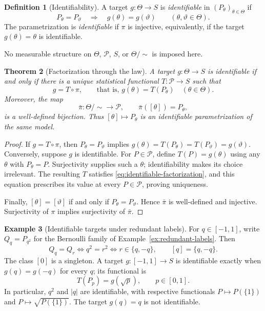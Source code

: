 \documentclass[11pt,oneside]{book}
\newtheorem{theorem}{Theorem}[chapter]
\theoremstyle{definition}
\newtheorem{definition}[theorem]{Definition}
\newtheorem{example}[theorem]{Example}
\theoremstyle{remark}
\begin{document}
\begin{definition}[Identifiability]
\label{def:identifiability}
A target $g:\Theta\to S$ is \emph{identifiable} in $(P_\theta)_{\theta\in\Theta}$
if
\[
P_\theta=P_\vartheta\quad\Longrightarrow\quad g(\theta)=g(\vartheta)
\qquad(\theta,\vartheta\in\Theta).
\]
The parametrization is \emph{identifiable} if $\pi$ is injective, equivalently,
if the target $g(\theta)=\theta$ is identifiable.
\end{definition}

No measurable structure on $\Theta$, $\mathcal P$, $S$, or $\Theta/{\sim}$
is imposed here.

\begin{theorem}[Factorization through the law]
\label{thm:identifiable-factorization}
A target $g:\Theta\to S$ is identifiable if and only if there is a unique
statistical functional $T:\mathcal P\to S$ such that
\begin{equation}
g=T\circ\pi,\qquad\text{that is, }g(\theta)=T(P_\theta)
\quad(\theta\in\Theta).
\label{eq:identifiable-factorization}
\end{equation}
Moreover, the map
\[
\bar\pi:\Theta/{\sim}\longrightarrow\mathcal P,\qquad
\bar\pi([\theta])=P_\theta,
\]
is a well-defined bijection. Thus $[\theta]\mapsto P_\theta$ is an
identifiable parametrization of the same model.
\end{theorem}
\begin{proof}
If $g=T\circ\pi$, then $P_\theta=P_\vartheta$ implies
$g(\theta)=T(P_\theta)=T(P_\vartheta)=g(\vartheta)$.
Conversely, suppose $g$ is identifiable. For $P\in\mathcal P$, define
$T(P)=g(\theta)$ using any $\theta$ with $P_\theta=P$.
Surjectivity supplies such a $\theta$; identifiability makes its choice
irrelevant. The resulting $T$ satisfies \eqref{eq:identifiable-factorization},
and this equation prescribes its value at every $P\in\mathcal P$, proving
uniqueness.

Finally, $[\theta]=[\vartheta]$ if and only if $P_\theta=P_\vartheta$.
Hence $\bar\pi$ is well-defined and injective.
Surjectivity of $\pi$ implies surjectivity of $\bar\pi$.
\end{proof}

\begin{example}[Identifiable targets under redundant labels]
\label{ex:identifiable-bernoulli-targets}
For $q\in[-1,1]$, write $Q_q=P_{q^2}$ for the Bernoulli family of
Example~\ref{ex:redundant-labels}. Then
\[
Q_q=Q_r\iff q^2=r^2\iff r\in\{q,-q\},
\qquad [q]=\{q,-q\}.
\]
The class $[0]$ is a singleton.
A target $g:[-1,1]\to S$ is identifiable exactly when
$g(q)=g(-q)$ for every $q$; its functional is
\[
T(P_p)=g(\sqrt p),\qquad p\in[0,1].
\]
In particular, $q^2$ and $|q|$ are identifiable, with respective functionals
$P\mapsto P(\{1\})$ and $P\mapsto\sqrt{P(\{1\})}$.
The target $g(q)=q$ is not identifiable.
\end{example}
\end{document}
